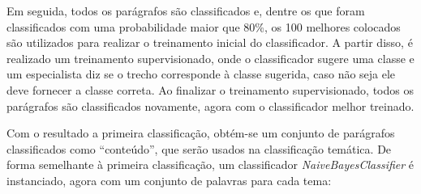 Em seguida, todos os parágrafos são classificados e, dentre os que foram classificados com uma probabilidade maior que 80\%, os 100 melhores colocados são utilizados para realizar o treinamento inicial do classificador. A partir disso, é realizado um treinamento supervisionado, onde o classificador sugere uma classe e um especialista diz se o trecho corresponde à classe sugerida, caso não seja ele deve fornecer a classe correta. Ao finalizar o treinamento supervisionado, todos os parágrafos são classificados novamente, agora com o classificador melhor treinado.

Com o resultado a primeira classificação, obtém-se um conjunto de parágrafos classificados como ``conteúdo'', que serão usados na classificação temática. De forma semelhante à primeira classificação, um classificador \textit{NaiveBayesClassifier} é instanciado, agora com um conjunto de palavras para cada tema:

